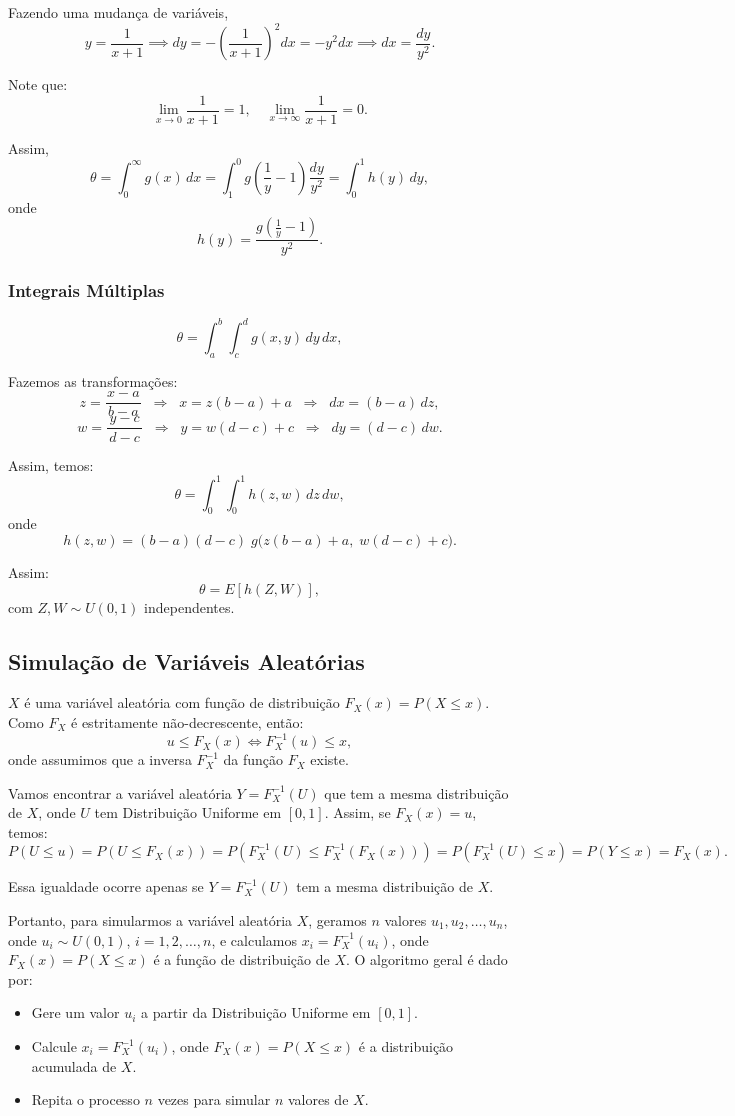 \documentclass{article}
\begin{document}
Fazendo uma mudança de variáveis,
    $$
    y = \frac{1}{x+1}
    \implies dy = -\left(\frac{1}{x+1}\right)^{2} dx
    = -y^2 dx
    \implies dx = \frac{dy}{y^2}.
    $$

Note que:
    $$
    \lim_{x \to 0} \frac{1}{x+1} = 1, \quad
    \lim_{x \to \infty} \frac{1}{x+1} = 0.
    $$

Assim,
    $$
    \theta = \int_{0}^{\infty} g(x)\, dx
    = \int_{1}^{0} g\left( \frac{1}{y} - 1 \right) \frac{dy}{y^2}
    = \int_{0}^{1} h(y)\, dy,
    $$
    onde
    $$
    h(y) = \frac{g\left( \frac{1}{y} - 1 \right)}{y^2}.
    $$

\subsubsection{Integrais Múltiplas}
    $$
    \theta = \int_{a}^{b}\!\!\int_{c}^{d} g(x,y)\, dy\, dx,
    $$

Fazemos as transformações:
    $$
    z=\frac{x-a}{\,b-a\,} \;\;\Longrightarrow\;\; x = z(b-a)+a \;\;\Longrightarrow\;\; dx=(b-a)\,dz,
    $$
    $$
    w=\frac{y-c}{\,d-c\,} \;\;\Longrightarrow\;\; y = w(d-c)+c \;\;\Longrightarrow\;\; dy=(d-c)\,dw.
    $$
    
Assim, temos:
    $$
    \theta=\int_{0}^{1}\!\!\int_{0}^{1} h(z,w)\, dz\, dw,
    $$
onde
    $$
    h(z,w)=(b-a)(d-c)\; g\!\big(z(b-a)+a,\; w(d-c)+c\big).
    $$

    Assim:
    $$
    \theta = E\!\left[h(Z,W)\right],
    $$
com $Z,W \sim U(0,1)$ independentes.

\subsection{Simulação de Variáveis Aleatórias}
$X$ é uma variável aleatória com função de distribuição $F_X(x) = P(X \le x)$. Como $F_X$ é estritamente não-decrescente, então:
    $$
    u \le F_X(x) \iff F_X^{-1}(u) \le x,
    $$
onde assumimos que a inversa $F_X^{-1}$ da função $F_X$ existe.

Vamos encontrar a variável aleatória $Y = F_X^{-1}(U)$ que tem a mesma distribuição de $X$,
onde $U$ tem Distribuição Uniforme em $[0,1]$.
Assim, se $F_X(x) = u$, temos:
$$
P(U \le u) = P(U \le F_X(x))
= P(F_X^{-1}(U) \le F_X^{-1}(F_X(x)))
= P(F_X^{-1}(U) \le x) = P(Y \le x) = F_X(x).
$$

Essa igualdade ocorre apenas se $Y = F_X^{-1}(U)$ tem a mesma distribuição de $X$.

Portanto, para simularmos a variável aleatória $X$, geramos $n$ valores $u_1, u_2, \ldots, u_n$, onde $u_i \sim U(0,1)$, $i = 1,2,\ldots,n$, e calculamos $x_i = F_X^{-1}(u_i)$, onde $F_X(x) = P(X \le x)$ é a função de distribuição de $X$. O algoritmo geral é dado por:
\begin{itemize}
    \item Gere um valor $u_i$ a partir da Distribuição Uniforme em $[0,1]$.
    \item Calcule $x_i = F_X^{-1}(u_i)$, onde $F_X(x) = P(X \le x)$ é a distribuição acumulada de $X$.
    \item Repita o processo $n$ vezes para simular $n$ valores de $X$.
\end{itemize}
\end{document}
